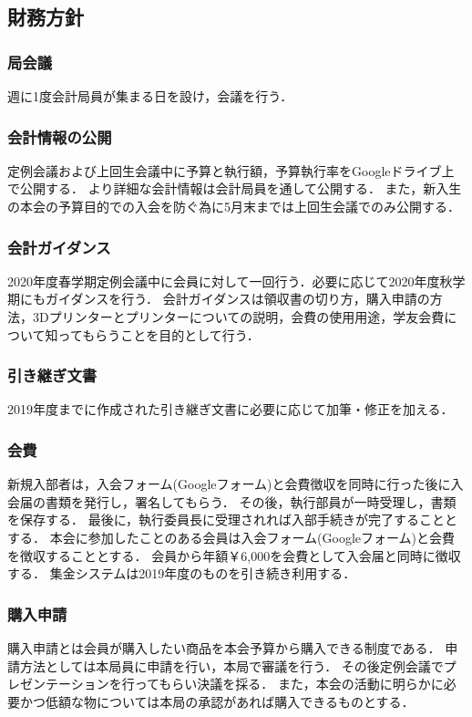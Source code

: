 \subsection*{財務方針}


\subsubsection*{局会議}
週に1度会計局員が集まる日を設け，会議を行う．

\subsubsection*{会計情報の公開}
定例会議および上回生会議中に予算と執行額，予算執行率をGoogleドライブ上で公開する．
より詳細な会計情報は会計局員を通して公開する．
また，新入生の本会の予算目的での入会を防ぐ為に5月末までは上回生会議でのみ公開する．

\subsubsection*{会計ガイダンス}
2020年度春学期定例会議中に会員に対して一回行う．必要に応じて2020年度秋学期にもガイダンスを行う．
会計ガイダンスは領収書の切り方，購入申請の方法，3Dプリンターとプリンターについての説明，会費の使用用途，学友会費について知ってもらうことを目的として行う．

\subsubsection*{引き継ぎ文書}
2019年度までに作成された引き継ぎ文書に必要に応じて加筆・修正を加える．

\subsubsection*{会費}
新規入部者は，入会フォーム(Googleフォーム)と会費徴収を同時に行った後に入会届の書類を発行し，署名してもらう．
その後，執行部員が一時受理し，書類を保存する．
最後に，執行委員長に受理されれば入部手続きが完了することとする．
本会に参加したことのある会員は入会フォーム(Googleフォーム)と会費を徴収することとする．
会員から年額￥6,000を会費として入会届と同時に徴収する．
集金システムは2019年度のものを引き続き利用する．

\subsubsection*{購入申請}
購入申請とは会員が購入したい商品を本会予算から購入できる制度である．
申請方法としては本局員に申請を行い，本局で審議を行う．
その後定例会議でプレゼンテーションを行ってもらい決議を採る．
また，本会の活動に明らかに必要かつ低額な物については本局の承認があれば購入できるものとする．

